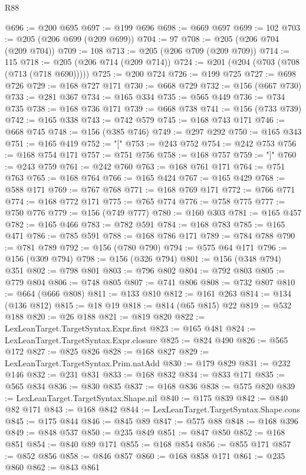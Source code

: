 \begin{lexlean}{R88}
\begin{coremodule}
@696 := @200 @695
@697 := @199 @696
@698 := @669 @697
@699 := 102
@703 := @205 (@206 @699 (@209 @699))
@704 := 97
@708 := @205 (@206 @704 (@209 @704))
@709 := 108
@713 := @205 (@206 @709 (@209 @709))
@714 := 115
@718 := @205 (@206 @714 (@209 @714))
@724 := @201 (@204 (@703 (@708 (@713 (@718 @690)))))
@725 := @200 @724
@726 := @199 @725
@727 := @698 @726
@729 := @168 @727 @171
@730 := @668 @729
@732 := @156 (@667 @730)
@733 := @281 @367
@734 := @165 @334
@735 := @565 @449
@736 := @734 @735
@738 := @168 @736 @171
@739 := @668 @738
@741 := @156 (@733 @739)
@742 := @165 @338
@743 := @742 @579
@745 := @168 @743 @171
@746 := @668 @745
@748 := @156 (@385 @746)
@749 := @297 @292
@750 := @165 @343
@751 := @165 @419
@752 := "["
@753 := @243 @752
@754 := @242 @753
@756 := @168 @754 @171
@757 := @751 @756
@758 := @168 @757
@759 := "]"
@760 := @243 @759
@761 := @242 @760
@763 := @168 @761 @171
@764 := @751 @763
@765 := @168 @764
@766 := @165 @424
@767 := @165 @429
@768 := @588 @171
@769 := @767 @768
@771 := @168 @769 @171
@772 := @766 @771
@774 := @168 @772 @171
@775 := @765 @774
@776 := @758 @775
@777 := @750 @776
@779 := @156 (@749 @777)
@780 := @160 @303
@781 := @165 @457
@782 := @165 @466
@783 := @782 @591
@784 := @168 @783
@785 := @165 @471
@786 := @785 @591
@788 := @168 @786 @171
@789 := @784 @788
@790 := @781 @789
@792 := @156 (@780 @790)
@794 := @575 @64 @171
@796 := @156 (@309 @794)
@798 := @156 (@326 @794)
@801 := @156 (@348 @794) @351
@802 := @798 @801
@803 := @796 @802
@804 := @792 @803
@805 := @779 @804
@806 := @748 @805
@807 := @741 @806
@808 := @732 @807
@810 := @664 (@666 @808)
@811 := @133 @810
@812 := @161 @263
@814 := @134 (@136 @812)
@815 := @18 @19
@818 := @814 (@65 @815) @22
@819 := @532 @188
@820 := @26 @188
@821 := @819 @820
@822 := LexLeanTarget.TargetSyntax.Expr.first
@823 := @165 @481
@824 := LexLeanTarget.TargetSyntax.Expr.closure
@825 := @824 @490
@826 := @565 @172
@827 := @825 @826
@828 := @168 @827
@829 := LexLeanTarget.TargetSyntax.Prim.natAdd
@830 := @179 @829
@831 := @232 @146
@832 := @231 @831
@833 := @168 @832
@834 := @833 @171
@835 := @565 @834
@836 := @830 @835
@837 := @168 @836
@838 := @575 @820
@839 := LexLeanTarget.TargetSyntax.Shape.nil
@840 := @175 @839
@842 := @840 @82 @171
@843 := @168 @842
@844 := LexLeanTarget.TargetSyntax.Shape.cons
@845 := @175 @844
@846 := @845 @89
@847 := @575 @88
@848 := @168 @396
@849 := @848 @537
@850 := @235 @849
@851 := @847 @850
@852 := @168 @851
@854 := @840 @89 @171
@855 := @168 @854
@856 := @855 @171
@857 := @852 @856
@858 := @846 @857
@860 := @168 @858 @171
@861 := @235 @860
@862 := @843 @861

\end{coremodule}
\end{lexlean}
